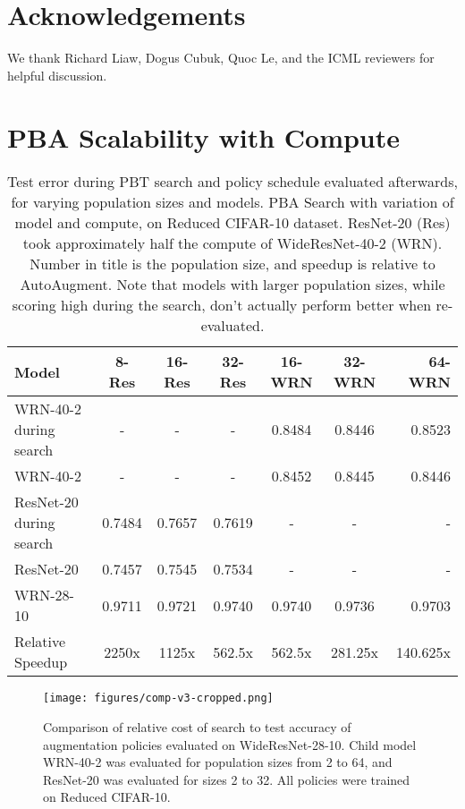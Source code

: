 \documentclass{article}
\begin{document}
\section*{Acknowledgements}
We thank Richard Liaw, Dogus Cubuk, Quoc Le, and the ICML reviewers for helpful discussion.






\nocite{pbt}




\clearpage

\appendix
\section{PBA Scalability with Compute}
\label{section-compute}

\begin{table*}[t]
\caption{Test error during PBT search and policy schedule evaluated afterwards, for varying population sizes and models. PBA Search with variation of model and compute, on Reduced CIFAR-10 dataset. ResNet-20 (Res) took approximately half the compute of WideResNet-40-2 (WRN). Number in title is the population size, and speedup is relative to AutoAugment. Note that models with larger population sizes, while scoring high during the search, don't actually perform better when re-evaluated.}
\label{table-cifar10-ablation-comp}
\vskip 0.15in
\begin{center}
\begin{small}
\begin{tabular}{lcccccr}
\toprule
Model & 8-Res & 16-Res & 32-Res & 16-WRN & 32-WRN & 64-WRN  \\
\midrule
WRN-40-2 during search & - & - & - & 0.8484 & 0.8446 & 0.8523  \\
WRN-40-2 & - & - & - & 0.8452 & 0.8445 & 0.8446   \\
ResNet-20 during search & 0.7484 & 0.7657 & 0.7619 & - & - & -  \\
ResNet-20 & 0.7457 & 0.7545 & 0.7534 & - & - & -    \\
WRN-28-10 & 0.9711 & 0.9721 & 0.9740 & 0.9740 & 0.9736 & 0.9703 \\
\midrule
Relative Speedup & 2250x & 1125x & 562.5x & 562.5x & 281.25x & 140.625x \\
\bottomrule
\end{tabular}
\end{small}
\end{center}
\vskip -0.1in
\end{table*} 
\begin{figure}[t]
  \centering
  \texttt{[image: figures/comp-v3-cropped.png]}
  \caption{Comparison of relative cost of search to test accuracy of augmentation policies evaluated on WideResNet-28-10. Child model WRN-40-2 was evaluated for population sizes from 2 to 64, and ResNet-20 was evaluated for sizes 2 to 32. All policies were trained on Reduced CIFAR-10.}
  \label{fig:compute}
\end{figure}
\end{document}
